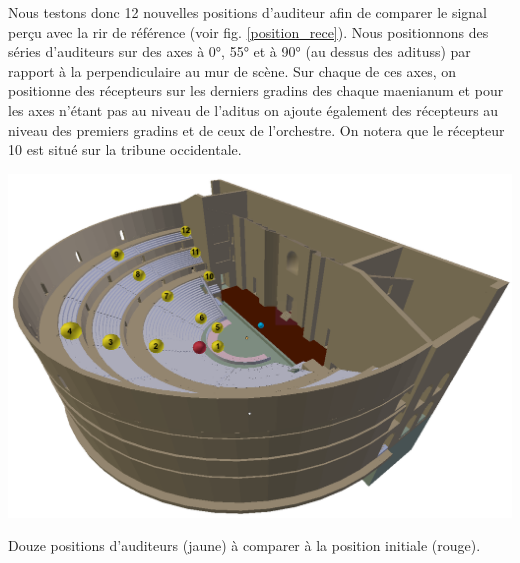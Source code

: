 Nous testons donc 12 nouvelles positions d'auditeur afin de comparer le signal perçu avec la \gls{rir} de référence (voir fig. \ref{position_rece}). Nous positionnons des séries d'auditeurs sur des axes à 0°, 55° et à 90° (au dessus des \glspl{aditus}) par rapport à la perpendiculaire au mur de scène. Sur chaque de ces axes, on positionne des récepteurs sur les derniers gradins des chaque \gls{maenianum} et pour les axes n'étant pas au niveau de l'\gls{aditus} on ajoute également des récepteurs au niveau des premiers gradins et de ceux de l'orchestre. On notera que le récepteur 10 est situé sur la tribune occidentale.
\begin{figureth}
	\includegraphics[width=\linewidth]{images/position_rece}
	\caption{Douze positions d'auditeurs (jaune) à comparer à la position initiale (rouge).}
	\label{position_rece}
\end{figureth}
%
